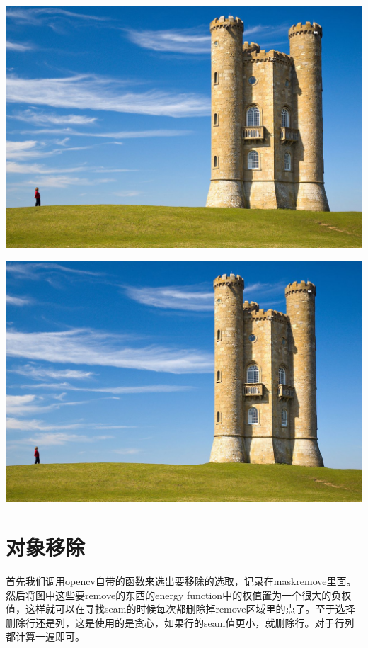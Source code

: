 \documentclass[10pt, a4paper]{article}
\begin{document}
    \includegraphics[scale = .3]{sky.jpeg}
    
    \includegraphics[scale = .3]{skyAmplify.jpg}
  \section{对象移除}
    首先我们调用opencv自带的函数来选出要移除的选取，记录在maskremove里面。然后将图中这些要remove的东西的energy function中的权值置为一个很大的负权值，这样就可以在寻找seam的时候每次都删除掉remove区域里的点了。至于选择删除行还是列，这是使用的是贪心，如果行的seam值更小，就删除行。对于行列都计算一遍即可。
\end{document}
